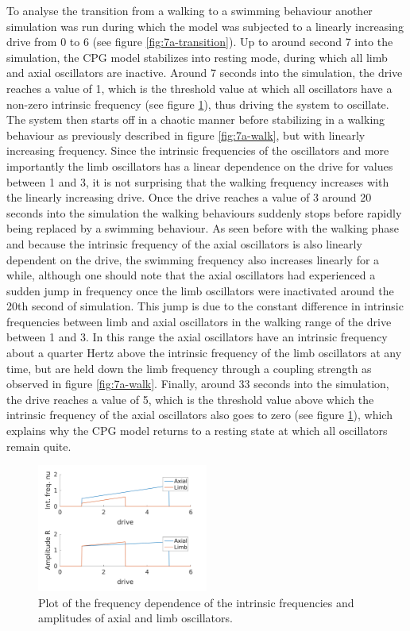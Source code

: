 \documentclass[a4paper]{scrartcl}
\begin{document}
To analyse the transition from a walking to a swimming behaviour another simulation was run during which the model was subjected to a linearly increasing drive from 0 to 6 (see figure \ref{fig:7a-transition}). Up to around second 7 into the simulation, the CPG model stabilizes into resting mode, during which all limb and axial oscillators are inactive. Around 7 seconds into the simulation, the drive reaches a value of 1, which is the threshold value at which all oscillators have a non-zero intrinsic frequency (see figure \ref{fig:7a-saturation}), thus driving the system to oscillate. The system then starts off in a chaotic manner before stabilizing in a walking behaviour as previously described in figure \ref{fig:7a-walk}, but with linearly increasing frequency. Since the intrinsic frequencies of the oscillators and more importantly the limb oscillators has a linear dependence on the drive for values between 1 and 3, it is not surprising that the walking frequency increases with the linearly increasing drive. Once the drive reaches a value of 3 around 20 seconds into the simulation the walking behaviours suddenly stops before rapidly being replaced by a swimming behaviour. As seen before with the walking phase and because the intrinsic frequency of the axial oscillators is also linearly dependent on the drive, the swimming frequency also increases linearly for a while, although one should note that the axial oscillators had experienced a sudden jump in frequency once the limb oscillators were inactivated around the 20th second of simulation. This jump is due to the constant difference in intrinsic frequencies between limb and axial oscillators in the walking range of the drive between 1 and 3. In this range the axial oscillators have an intrinsic frequency about a quarter Hertz above the intrinsic frequency of the limb oscillators at any time, but are held down the limb frequency through a coupling strength as observed in figure \ref{fig:7a-walk}. Finally, around 33 seconds into the simulation, the drive reaches a value of 5, which is the threshold value above which the intrinsic frequency of the axial oscillators also goes to zero (see figure \ref{fig:7a-saturation}), which explains why the CPG model returns to a resting state at which all oscillators remain quite.

\begin{figure}[!h]
	\includegraphics[width=0.5\textwidth]{fig/figure7a-frequency-drive-dependence.png}
	\caption{Plot of the frequency dependence of the intrinsic frequencies and amplitudes of axial and limb oscillators.}
	\label{fig:7a-saturation}
\end{figure}
\end{document}
